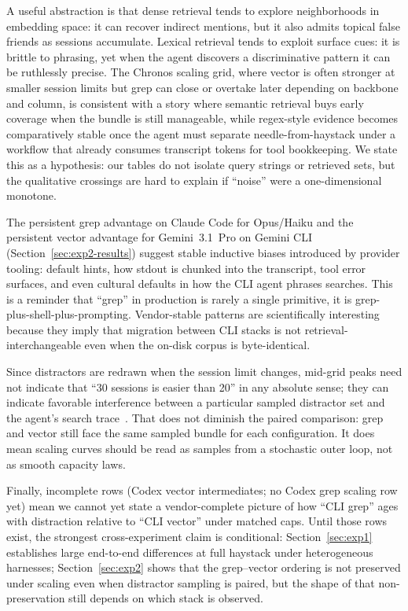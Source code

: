 \documentclass[sigconf,nonacm]{acmart}
\begin{document}
A useful abstraction is that dense retrieval tends to explore neighborhoods in embedding space: it can recover indirect mentions, but it also admits topical false friends as sessions accumulate. Lexical retrieval tends to exploit surface cues: it is brittle to phrasing, yet when the agent discovers a discriminative pattern it can be ruthlessly precise. The Chronos scaling grid, where vector is often stronger at smaller session limits but grep can close or overtake later depending on backbone and column, is consistent with a story where semantic retrieval buys early coverage when the bundle is still manageable, while regex-style evidence becomes comparatively stable once the agent must separate needle-from-haystack under a workflow that already consumes transcript tokens for tool bookkeeping. We state this as a hypothesis: our tables do not isolate query strings or retrieved sets, but the qualitative crossings are hard to explain if ``noise'' were a one-dimensional monotone.

The persistent grep advantage on Claude Code for Opus/Haiku and the persistent vector advantage for Gemini~3.1~Pro on Gemini CLI (Section~\ref{sec:exp2-results}) suggest stable inductive biases introduced by provider tooling: default hints, how stdout is chunked into the transcript, tool error surfaces, and even cultural defaults in how the CLI agent phrases searches. This is a reminder that ``grep'' in production is rarely a single primitive, it is grep-plus-shell-plus-prompting. Vendor-stable patterns are scientifically interesting because they imply that migration between CLI stacks is not retrieval-interchangeable even when the on-disk corpus is byte-identical.

Since distractors are redrawn when the session limit changes, mid-grid peaks need not indicate that ``30 sessions is easier than 20'' in any absolute sense; they can indicate favorable interference between a particular sampled distractor set and the agent's search trace~\cite{packer2023memgpt}. That does not diminish the paired comparison: grep and vector still face the same sampled bundle for each configuration. It does mean scaling curves should be read as samples from a stochastic outer loop, not as smooth capacity laws.

Finally, incomplete rows (Codex vector intermediates; no Codex grep scaling row yet) mean we cannot yet state a vendor-complete picture of how ``CLI grep'' ages with distraction relative to ``CLI vector'' under matched caps. Until those rows exist, the strongest cross-experiment claim is conditional: Section~\ref{sec:exp1} establishes large end-to-end differences at full haystack under heterogeneous harnesses; Section~\ref{sec:exp2} shows that the grep--vector ordering is not preserved under scaling even when distractor sampling is paired, but the shape of that non-preservation still depends on which stack is observed.
\end{document}
